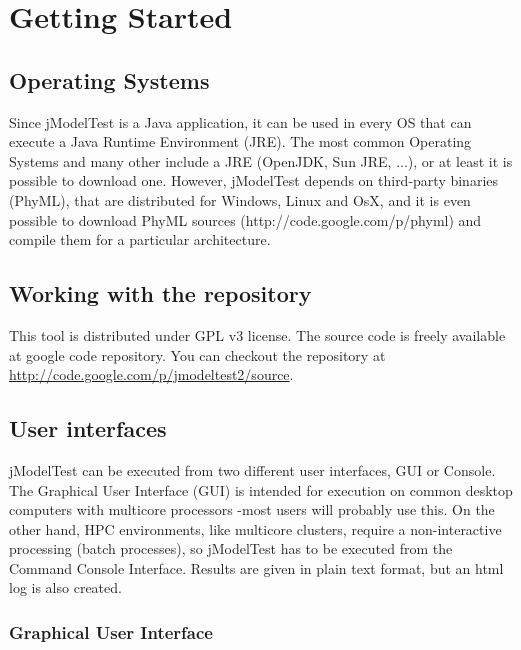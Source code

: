 \section{Getting Started}

\subsection{Operating Systems}

Since jModelTest is a Java application, it can be used in every OS that can execute a Java Runtime Environment (JRE). The most common Operating Systems and many other include a JRE (OpenJDK, Sun JRE, ...), or at least it is possible to download one. However, jModelTest depends on third-party binaries (PhyML), that are distributed for Windows, Linux and OsX, and it is even possible to download PhyML sources (http://code.google.com/p/phyml) and compile them for a particular architecture.

\subsection{Working with the repository}

This tool is distributed under GPL v3 license. The source code is freely available at google code repository. You can checkout the repository at \url{http://code.google.com/p/jmodeltest2/source}.

\subsection{User interfaces}

jModelTest can be executed from two different user interfaces, GUI or Console. The Graphical User Interface (GUI) is intended for execution on common desktop computers with multicore processors -most users will probably use this. On the other hand, HPC environments, like multicore clusters, require a non-interactive processing (batch processes), so jModelTest has to be executed from the Command Console Interface. Results are given in plain text format, but an html log is also created.

\subsubsection{Graphical User Interface}

